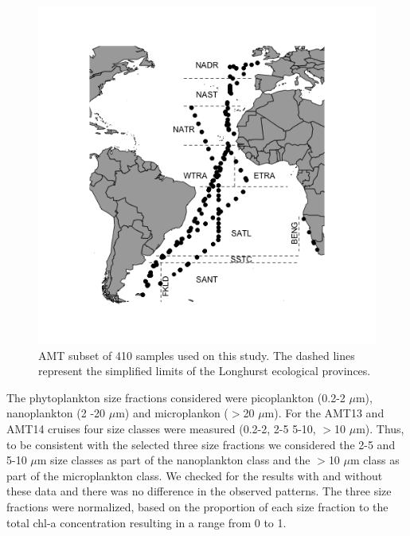 \begin{figure}
\begin{center}
\includegraphics[trim = 30mm 15mm 25mm 15mm, clip, width=1\linewidth]{./Chp2-Pre/amt_mapFINAL2.png}
\end{center}
\caption[Scheme]{\small {AMT subset of 410 samples used on this study. The dashed lines represent the simplified limits of the Longhurst ecological provinces.}}
\label{Map}
\end{figure}

The phytoplankton size fractions considered were picoplankton (0.2-2 $\mu$m), nanoplankton (2 -20 $\mu$m) and microplankon ($>$20 $\mu$m). For the AMT13 and AMT14 cruises four size classes were measured (0.2-2, 2-5 5-10, $>$10 $\mu$m). Thus, to be consistent with the selected three size fractions we considered the 2-5 and 5-10 $\mu$m size classes as part of the nanoplankton class and the $>$10 $\mu$m class as part of the microplankton class. We checked for the results with and without these data and there was no difference in the observed patterns. The three size fractions were normalized, based on the proportion of each size fraction to the total chl-a concentration resulting in a range from 0 to 1.

